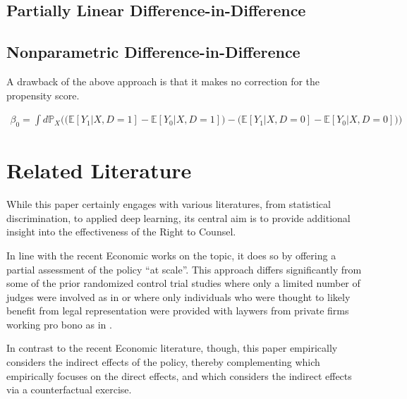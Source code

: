 \documentclass[a4paper,12pt]{article}
\begin{document}
\subsection{Partially Linear Difference-in-Difference}

\subsection{Nonparametric Difference-in-Difference}
A drawback of the above approach is that it makes no correction for the propensity score. 

\begin{align*}
    \beta _0 = \int d\mathbb{P}_X\Big(\big(\mathbb{E}[Y_1 |X,D=1] - \mathbb{E}[Y_0 |X,D=1]\big) -  \big(\mathbb{E}[Y_1 |X,D=0] - \mathbb{E}[Y_0 |X,D=0]\big)\Big)
\end{align*}

\section{Related Literature}
 While this paper certainly engages with various literatures, from statistical discrimination, to applied deep learning, its central aim is to provide additional insight into the effectiveness of the Right to Counsel. \par 
 In line with the recent Economic works on the topic, it does so by offering a partial assessment of the policy ``at scale''. This approach differs significantly from some of the prior randomized control trial studies where only a limited number of judges were involved as in \cite{greiner2012limits} or where only individuals who were thought to likely benefit from legal representation were provided with laywers from private firms working pro bono as in \cite{seron2001impact}.   

In contrast to the recent Economic literature, though, this paper empirically considers the indirect effects of the policy, thereby complementing \cite{cassidy2022effects} which empirically focuses on the direct effects, and \cite{abramson2021welfare} which considers the indirect effects via a counterfactual exercise.
\end{document}
